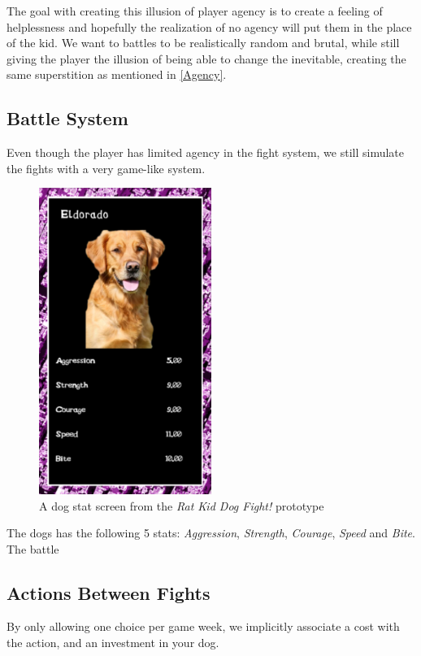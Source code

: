 The goal with creating this illusion of player agency is to create a feeling of helplessness and hopefully the realization of no agency will put them in the place of the kid. 
We want to battles to be realistically random and brutal, while still giving the player the illusion of being able to change the inevitable, creating the same superstition as mentioned in \ref{Agency}.\\

\subsection{Battle System}
Even though the player has limited agency in the fight system, we still simulate the fights with a very game-like system.\\

\begin{figure}[h!]
	\centering
    \includegraphics[width=0.5\textwidth]{DogStats.png}
    \caption{A dog stat screen from the \textit{Rat Kid Dog Fight!} prototype}
    \label{fig:DogStatScreen}
\end{figure}


The dogs has the following 5 stats: \textit{Aggression}, \textit{Strength}, \textit{Courage}, \textit{Speed} and \textit{Bite}.\\

The battle 








\subsection{Actions Between Fights}
By only allowing one choice per game week, we implicitly associate a cost with the action, and an investment in your dog.

